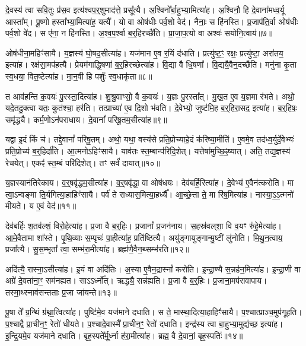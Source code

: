 दे॒वस्य॑ त्वा सवि॒तुः प्र॑स॒व इत्य॑श्वप॒र्॒शुमाद॑त्ते॒ प्रसू᳚त्यै।
अ॒श्विनो᳚र्बा॒हुभ्या॒मित्या॑ह।
अ॒श्विनौ॒ हि दे॒वाना॑मध्व॒र्यू आस्ता᳚म्।
पू॒ष्णो हस्ता᳚भ्या॒मित्या॑ह॒ यत्यै᳚।
यो वा ओष॑धीः पर्व॒शो वेद॑।
नैनाः॒ स हि॑नस्ति।
प्र॒जा\-प॑ति॒र्वा ओष॑धीः पर्व॒शो वे॑द।
स ए॑ना॒ न हि॑नस्ति।
अ॒श्व॒प॒र्श्वा ब॒र्॒हिरच्छै॑ति।
प्रा॒जा॒प॒त्यो वा अश्वः॑ सयोनि॒त्वाय॑॥७॥\ip

ओष॑धीना॒महिꣳ॑सायै।
य॒ज्ञस्य॑ घो॒षद॒सीत्या॑ह।
यज॑मान ए॒व र॒यिं द॑धाति।
प्रत्यु॑ष्ट॒ꣳ॒ रक्षः॒ प्रत्यु॑ष्टा॒ अरा॑तय॒ इत्या॑ह।
रक्ष॑सा॒मप॑हत्यै।
प्रेयम॑गाद्धि॒षणा॑ ब॒र्॒हिरच्छेत्या॑ह।
वि॒द्या वै धि॒षणा᳚।
वि॒द्ययै॒वैन॒दच्छै॑ति।
मनु॑ना कृ॒ता स्व॒धया॒ वित॒ष्टेत्या॑ह।
मा॒न॒वी हि पर्\mbox{}शुः॑ स्व॒धाकृ॑ता॥८॥\ip

त आव॑हन्ति क॒वयः॑ पु॒रस्ता॒दित्या॑ह।
शु॒श्रु॒वाꣳसो॒ वै क॒वयः॑।
य॒ज्ञः पु॒रस्ता᳚त्।
मु॒ख॒त ए॒व य॒ज्ञमा र॑भते।
अथो॒ यदे॒तदु॒क्त्वा यतः॒ कुत॑श्चा॒ हर॑ति।
तत्प्राच्या॑ ए॒व दि॒शो भ॑वति।
दे॒वेभ्यो॒ जुष्ट॑मि॒ह ब॒र्॒हिरा॒सद॒ इत्या॑ह।
ब॒र्॒\mbox{}हिषः॒ समृ॑द्ध्यै।
कर्म॒णो\-ऽन॑पराधाय।
दे॒वानां᳚ परिषू॒तम॒सीत्या॑ह॥९॥\ip

यद्वा इ॒दं किं च॑।
तद्दे॒वानां᳚ परिषू॒तम्।
अथो॒ यथा॒ वस्य॑से प्रति॒प्रोच्याहे॒दं क॑रिष्या॒मीति॑।
ए॒वमे॒व तद॑ध्व॒र्युर्दे॒वेभ्यः॑ प्रति॒प्रोच्य॑ ब॒र्॒हिर्दा॑ति।
आ॒त्मनो\-ऽहिꣳ॑सायै।
याव॑तः स्त॒म्बान्प॑रिदि॒शेत्।
यत्तेषा॑मुच्छि॒ꣴ॒ष्यात्।
अति॒ तद्य॒ज्ञस्य॑ रेचयेत्।
एकꣴ॑ स्त॒म्बं परि॑दिशेत्।
तꣳ सर्वं॑ दायात्॥१०॥\ip

य॒ज्ञस्यान॑तिरेकाय।
व॒र्॒षवृ॑द्धम॒सीत्या॑ह।
व॒र्॒षवृ॑द्धा॒ वा ओष॑धयः।
देव॑बर्\mbox{}हि॒रित्या॑ह।
दे॒वेभ्य॑ ए॒वैन॑त्करोति।
मा त्वा॒\-ऽन्वङ्मा ति॒र्यगित्या॒हाहिꣳ॑सायै।
पर्व॑ ते राध्यास॒मित्या॒हर्ध्यै᳚।
आ॒च्छे॒त्ता ते॒ मा रि॑ष॒मित्या॑ह।
नास्या॒ऽ॒ऽ॒त्मनो॑ मीयते।
य ए॒वं वेद॑॥११॥\ip

देव॑बर्\mbox{}हिः श॒तव॑ल्\mbox{}शं॒ विरो॒हेत्या॑ह।
प्र॒जा वै ब॒र्॒हिः।
प्र॒जानां᳚ प्र॒जन॑नाय।
स॒हस्र॑वल्‌शा॒ वि व॒यꣳ रु॑हे॒मेत्या॑ह।
आ॒\-मे॒वैतामा शा᳚स्ते।
पृ॒थि॒व्याः स॒म्पृचः॑ पा॒हीत्या॑ह॒ प्रति॑\-ष्ठित्यै।
अयु॑ङ्गायुङ्गान्मु॒ष्टीं लु॑नोति।
मि॒थु॒न॒त्वाय॒ प्रजा᳚त्यै।
सु॒स॒म्भृता᳚ त्वा॒ सम्भ॑रा॒मीत्या॑ह।
ब्रह्म॑णै॒वैन॒थ्सम्भ॑रति॥१२॥\ip

अदि॑त्यै॒ रास्ना॒\-ऽसीत्या॑ह।
इ॒यं वा अदि॑तिः।
अ॒स्या ए॒वैन॒द्रास्नां᳚ करोति।
इ॒न्द्रा॒ण्यै स॒न्नह॑न॒मित्या॑ह।
इ॒न्द्रा॒णी वा अग्रे॑ दे॒वता॑ना॒ꣳ॒ सम॑नह्यत।
साऽऽर्ध्नो᳚त्।
ऋद्ध्यै॒ सन्न॑ह्यति।
प्र॒जा वै ब॒र्॒हिः।
प्र॒जाना॒मप॑रावापाय।
तस्मा॒थ्स्नाव॑सन्तताः प्र॒जा जा॑यन्ते॥१३॥\ip

पू॒षा ते᳚ ग्र॒न्थिं ग्र॑थ्ना॒त्वित्या॑ह।
पुष्टि॑मे॒व यज॑माने दधाति।
स ते॒ मास्था॒दित्या॒हाहिꣳ॑सायै।
प॒श्चात्प्राञ्च॒मुप॑गूहति।
प॒श्चाद्वै प्रा॒चीन॒ꣳ॒ रेतो॑ धीयते।
प॒श्चादे॒वास्मै᳚ प्रा॒चीन॒ꣳ॒ रेतो॑ दधाति।
इन्द्र॑स्य त्वा बा॒हुभ्या॒मुद्य॑च्छ॒ इत्या॑ह।
इ॒न्द्रि॒यमे॒व यज॑माने दधाति।
बृह॒स्पते᳚र्मू॒र्ध्ना ह॑रा॒मीत्या॑ह।
ब्रह्म॒ वै दे॒वानां॒ बृह॒स्पतिः॑॥१४॥\ip

